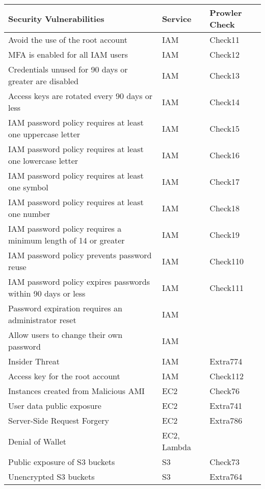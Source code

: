 \begin{longtable}{|p{10cm}|p{2.4cm}|p{2cm}|}
    \hline
    \textbf{Security Vulnerabilities} & \textbf{Service} & \textbf{Prowler Check}\\
    \hline
    Avoid the use of the root account & IAM & Check11 \\
    \hline
    MFA is enabled for all IAM users & IAM & Check12 \\
    \hline
    Credentials unused for 90 days or greater are disabled & IAM & Check13 \\
    \hline
    Access keys are rotated every 90 days or less & IAM & Check14 \\
    \hline
    IAM password policy requires at least one uppercase letter & IAM & Check15 \\
    \hline
    IAM password policy requires at least one lowercase letter & IAM & Check16 \\
    \hline
    IAM password policy requires at least one symbol & IAM & Check17\\
    \hline
    IAM password policy requires at least one number & IAM & Check18\\
    \hline
    IAM password policy requires a minimum length of 14 or greater & IAM & Check19\\
    \hline
    IAM password policy prevents password reuse & IAM & Check110\\
    \hline
    IAM password policy expires passwords within 90 days or less & IAM & Check111\\
    \hline
    Password expiration requires an administrator reset & IAM & \\
    \hline
    Allow users to change their own password & IAM& \\
    \hline
    Insider Threat & IAM & Extra774\\
    \hline
    Access key for the root account & IAM & Check112 \\
    \hline
    Instances created from Malicious AMI & EC2 & Check76\\
    \hline
    User data public exposure & EC2 & Extra741\\
    \hline
    Server-Side Request Forgery & EC2 & Extra786\\
    \hline
    Denial of Wallet & EC2, Lambda &\\
    \hline
    Public exposure of S3 buckets & S3 & Check73\\
    \hline
    Unencrypted S3 buckets & S3 & Extra764\\

\end{longtable}
